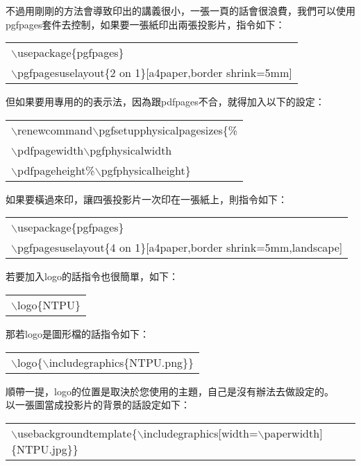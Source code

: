 \documentclass[12pt, a4paper]{article}
\begin{document}
不過用剛剛的方法會導致印出的講義很小，一張一頁的話會很浪費，我們可以使用pgfpages套件去控制，如果要一張紙印出兩張投影片，指令如下：
\begin{center}\colorbox{slight}{\begin{tabular}{p{}}
    $\backslash$usepackage\{pgfpages\}\\
	$\backslash$pgfpagesuselayout\{2 on 1\}[a4paper,border shrink=5mm]\\
\end{tabular}}
\end{center}
但如果要用專用的\XeLaTeX 的表示法，因為跟pdfpages不合，就得加入以下的設定：
\begin{center}\colorbox{slight}{\begin{tabular}{p{}}
    $\backslash$renewcommand$\backslash$pgfsetupphysicalpagesizes\{\%\\
    $\backslash$pdfpagewidth$\backslash$pgfphysicalwidth\\
    $\backslash$pdfpageheight\%$\backslash$pgfphysicalheight\}\\
\end{tabular}}
\end{center}
如果要橫過來印，讓四張投影片一次印在一張紙上，則指令如下：
\begin{center}\colorbox{slight}{\begin{tabular}{p{}}
    $\backslash$usepackage\{pgfpages\}\\
    $\backslash$pgfpagesuselayout\{4 on 1\}[a4paper,border shrink=5mm,landscape]\\
\end{tabular}}
\end{center}
若要加入logo的話指令也很簡單，如下：
\begin{center}\colorbox{slight}{\begin{tabular}{p{}}
    $\backslash$logo\{NTPU\}
\end{tabular}}
\end{center}
那若logo是圖形檔的話指令如下：
\begin{center}\colorbox{slight}{\begin{tabular}{p{}}
    $\backslash$logo\{$\backslash$includegraphics\{NTPU.png\}\}
\end{tabular}}
\end{center}
順帶一提，logo的位置是取決於您使用的主題，自己是沒有辦法去做設定的。\\
以一張圖當成投影片的背景的話設定如下：
\begin{center}\colorbox{slight}{\begin{tabular}{p{}}
    $\backslash$usebackgroundtemplate\{$\backslash$includegraphics[width=$\backslash$paperwidth]\{NTPU.jpg\}\}
\end{tabular}}
\end{center}
\end{document}
